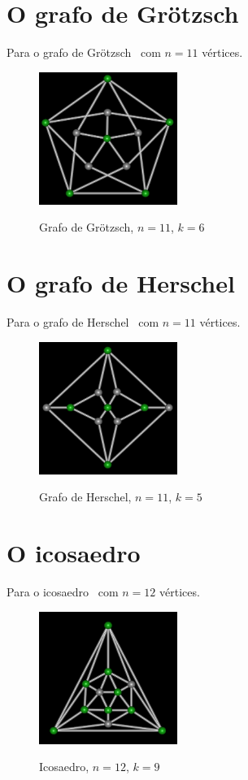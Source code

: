 \section{O grafo de Grötzsch}
Para o grafo de Grötzsch~\cite{cite:example-grotzsch} com $n=11$
vértices.

\begin{figure}[htb]
\centering
\includegraphics[width=0.4\textwidth]{img/grotzsch.png}
\label{fig:example-grotzsch}
\caption{Grafo de Grötzsch, $n=11$, $k=6$}
\end{figure}


\section{O grafo de Herschel}
Para o grafo de Herschel~\cite{cite:example-herschel} com $n=11$
vértices.

\begin{figure}[htb]
\centering
\includegraphics[width=0.4\textwidth]{img/herschel.png}
\label{fig:example-herschel}
\caption{Grafo de Herschel, $n=11$, $k=5$}
\end{figure}


\section{O icosaedro}
Para o icosaedro~\cite{cite:example-plato} com $n=12$ vértices.

\begin{figure}[htb]
\centering
\includegraphics[width=0.4\textwidth]{img/icosaedro.png}
\label{fig:example-icosaedro}
\caption{Icosaedro, $n=12$, $k=9$}
\end{figure}


